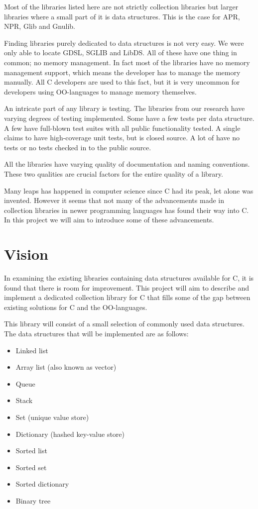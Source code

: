 \documentclass[table]{ituthesis}
\begin{document}
Most of the libraries listed here are not strictly collection libraries but larger libraries where a small part of it is data structures. This is the case for APR, NPR, Glib and Gnulib. 

Finding libraries purely dedicated to data structures is not very easy. We were only able to locate GDSL, SGLIB and LibDS. All of these have one thing in common; no memory management. In fact most of the libraries have no memory management support, which means the developer has to manage the memory manually. All C developers are used to this fact, but it is very uncommon for developers using OO-languages to manage memory themselves.

An intricate part of any library is testing. The libraries from our research have varying degrees of testing implemented. Some have a few tests per data structure. A few have full-blown test suites with all public functionality tested. A single claims to have high-coverage unit tests, but is closed source. A lot of have no tests or no tests checked in to the public source.

All the libraries have varying quality of documentation and naming conventions. These two qualities are crucial factors for the entire quality of a library.

Many leaps has happened in computer science since C had its peak, let alone was invented. However it seems that not many of the advancements made in collection libraries in newer programming languages has found their way into C. In this project we will aim to introduce some of these advancements.

\section{Vision}\label{sec:vision}

In examining the existing libraries containing data structures available for C, it is found that there is room for improvement.  This project will aim to describe and implement a dedicated collection library for C that fills some of the gap between existing solutions for C and the OO-languages.

This library will consist of a small selection of commonly used data structures. The data structures that will be implemented are as follows:

\begin{itemize}
	\item Linked list
	\item Array list (also known as vector)
	\item Queue
	\item Stack
	\item Set (unique value store)
	\item Dictionary (hashed key-value store)
	\item Sorted list
	\item Sorted set
	\item Sorted dictionary
	\item Binary tree
\end{itemize}
\end{document}
